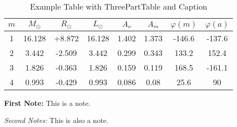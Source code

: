 \begin{table}[h!]
    \centering
    \begin{threeparttable}
        \caption{Example Table with ThreePartTable and Caption
        \label{tab : example-table-threeparttable }}
        \begin{tabular}{cccccccc}
            \toprule
            {$m$} & {$M_\odot$} & {$R_\odot$} & {$L_\odot$} & {$A_\nu$} & {$A_m$} & {$\varphi(m)$} & {$\varphi(a)$} \\ \midrule
            1  & 16.128 & +8.872 & 16.128 & 1.402 & 1.373 & -146.6 & -137.6 \\
            2  & 3.442  & -2.509 & 3.442  & 0.299 & 0.343 & 133.2  & 152.4  \\ \midrule
            3  & 1.826  & -0.363 & 1.826  & 0.159 & 0.119 & 168.5  & -161.1 \\
            4  & 0.993  & -0.429 & 0.993  & 0.086 & 0.08  & 25.6   & 90     \\ \bottomrule
        \end{tabular}
        \begin{tablenotes}[flushleft]
            \footnotesize
            \item \textbf{First Note:} This is a note.
            \item \textit{Second Notes:} This is also a note.
        \end{tablenotes}
    \end{threeparttable}
\end{table}